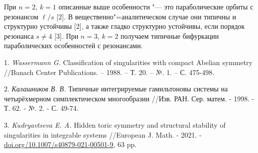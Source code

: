 При $n = 2$, $k = 1$ описанные выше особенности "--- это параболические орбиты с резонансом $\ell/s$ [2]. В вещественно"=аналитическом случае они типичны и структурно устойчивы [2], а также гладко структурно устойчивы, если порядок резонанса $s\ne4$ [3]. При $n = 3$, $k = 2$ получаем типичные бифуркации параболических особенностей с резонансами.

\litlist

1. {\it Wassermann G.} Classification of singularities with com\-pact Abelian symmetry //Banach Center Publications. – 1988. – Т. 20. – №. 1. – С. 475-498.

2. {\it Калашников В. В.} Типичные интегрируемые гамильтоновы системы на четырёхмерном симплектическом многообразии //Изв. РАН. Сер. матем. - 1998. - Т. 62. - №. 2. - С. 49-74.


3. {\it Kudryavtseva E. A.} Hidden toric symmetry and structu\-ral stability of singularities in integrable systems //European J. Math. - 2021. -
\href{https://doi.org/10.1007/s40879-021-00501-9}{doi.org/10.1007/s40879-021-00501-9},
63 pp.
